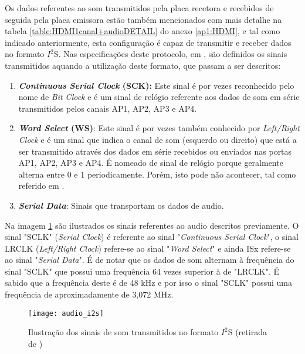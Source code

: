 Os dados referentes ao som transmitidos pela placa recetora e recebidos de seguida pela placa emissora estão também mencionados com mais detalhe na tabela \ref{table:HDMI1canal+audioDETAIL} do anexo \ref{ap1:HDMI}, e tal como indicado anteriormente, esta configuração é capaz de transmitir e receber dados no formato $I^{2}$S. Nas especificações deste protocolo, em \cite{R027}, são definidos os sinais transmitidos aquando a utilização deste formato, que passam a ser descritos:

\begin{enumerate}
	\item \textbf{\textit{Continuous Serial Clock} (SCK):} Este sinal é por vezes reconhecido pelo nome de \textit{Bit Clock} e é um sinal de relógio referente aos dados de som em série transmitidos pelos canais AP1, AP2, AP3 e AP4.
	
	\item \textbf{\textit{Word Select} (WS)}: Este sinal é por vezes também conhecido por \textit{Left/Right Clock} e é um sinal que indica o canal de som (esquerdo ou direito) que está a ser transmitido através dos dados em série recebidos ou enviados nas portas AP1, AP2, AP3 e AP4. É nomeado de sinal de relógio porque geralmente alterna entre 0 e 1 periodicamente. Porém, isto pode não acontecer, tal como referido em \cite{R027}. 
	
	\item \textbf{\textit{Serial Data}}: Sinais que transportam os dados de audio.

\end{enumerate}

Na imagem \ref{fig:i2s_audio} são ilustrados os sinais referentes ao audio descritos previamente. O sinal "SCLK" (\textit{Serial Clock}) é referente ao sinal "\textit{Continuous Serial Clock}", o sinal LRCLK (\textit{Left/Right Clock}) refere-se ao sinal "\textit{Word Select}" e ainda ISx refere-se ao sinal "\textit{Serial Data}". É de notar que os dados de som alternam à frequência do sinal "SCLK" que possui uma frequência 64 vezes superior à de "LRCLK". É sabido que a frequência deste é de 48 kHz e por isso o sinal "SCLK" possui uma frequência de aproximadamente de 3,072 MHz.

\begin{figure}[h!]
	\begin{center}
		\leavevmode
		\texttt{[image: audio\_i2s]}
		\caption[Ilustração dos sinais de som transmitidos no formato $I^{2}$S]{Ilustração dos sinais de som transmitidos no formato $I^{2}$S (retirada de \cite{R016})}
		\label{fig:i2s_audio}
	\end{center}
\end{figure}

